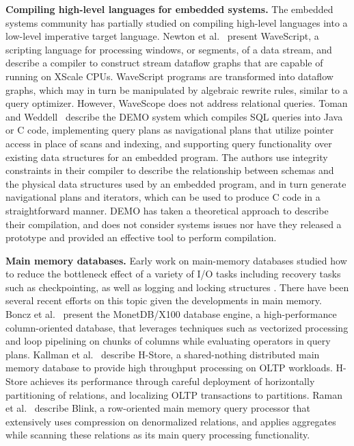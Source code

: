 \noindent \textbf{Compiling high-level languages for embedded systems.}
The embedded systems community has partially studied on compiling high-level
languages into a low-level imperative target language.
Newton et al.~\cite{newton-lctes:08} present WaveScript, a scripting language
for processing windows, or segments, of a data stream, and describe a compiler to
construct stream dataflow graphs that are capable of running on XScale CPUs.
WaveScript programs are transformed into dataflow graphs, which may in turn be
manipulated by algebraic rewrite rules, similar to a query optimizer. However,
WaveScope does not address relational queries.
Toman and Weddell~\cite{toman-dbtel:01} describe the DEMO system which compiles
SQL queries into Java or C code, implementing query plans as navigational plans
that utilize pointer access in place of scans and indexing, and supporting query
functionality over existing data structures for an embedded program. The authors
use integrity constraints in their compiler to describe the relationship between
schemas and the physical data structures used by an embedded program, and in turn
generate navigational plans and iterators, which can be used to produce C code in
a straightforward manner. DEMO has taken a theoretical approach to describe
their compilation, and does not consider systems issues nor have they released
a prototype and provided an effective tool to perform compilation.


\noindent \textbf{Main memory databases.}
Early work on main-memory databases studied how to reduce the bottleneck effect
of a variety of I/O tasks including recovery tasks such as checkpointing, as well
as logging and locking structures \cite{bohannon-sigmod:99}. There have been
several recent efforts on this topic given the developments in main memory.
Boncz et al.~\cite{boncz-cidr:05} present the MonetDB/X100 database engine, a
high-performance column-oriented database, that leverages techniques such as
vectorized processing and loop pipelining on chunks of columns while evaluating
operators in query plans. Kallman et al.~\cite{kallman-pvldb:08} describe
H-Store, a shared-nothing distributed main memory database to provide high
throughput processing on OLTP workloads. H-Store achieves its performance through
careful deployment of horizontally partitioning of relations, and localizing OLTP
transactions to partitions. Raman et al.~\cite{raman-icde:08} describe Blink, a
row-oriented main memory query processor that extensively uses compression on
denormalized relations, and applies aggregates while scanning these relations as
its main query processing functionality.

